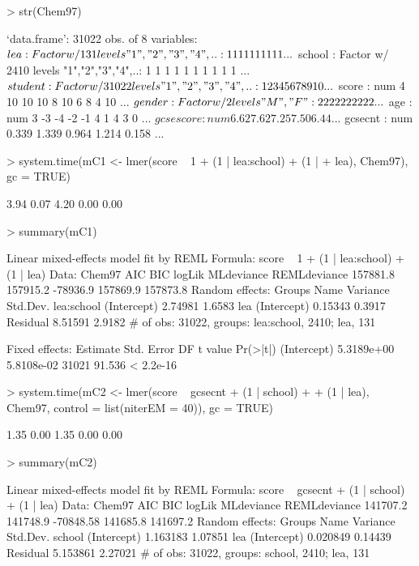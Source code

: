 \documentclass[12pt]{article}
\begin{document}
\begin{Schunk}
\begin{Sinput}
> str(Chem97)
\end{Sinput}
\begin{Soutput}
`data.frame':	31022 obs. of  8 variables:
 $ lea      : Factor w/ 131 levels "1","2","3","4",..: 1 1 1 1 1 1 1 1 1 1 ...
 $ school   : Factor w/ 2410 levels "1","2","3","4",..: 1 1 1 1 1 1 1 1 1 1 ...
 $ student  : Factor w/ 31022 levels "1","2","3","4",..: 1 2 3 4 5 6 7 8 9 10 ...
 $ score    : num  4 10 10 10 8 10 6 8 4 10 ...
 $ gender   : Factor w/ 2 levels "M","F": 2 2 2 2 2 2 2 2 2 2 ...
 $ age      : num  3 -3 -4 -2 -1 4 1 4 3 0 ...
 $ gcsescore: num  6.62 7.62 7.25 7.50 6.44 ...
 $ gcsecnt  : num  0.339 1.339 0.964 1.214 0.158 ...
\end{Soutput}
\begin{Sinput}
> system.time(mC1 <- lmer(score ~ 1 + (1 | lea:school) + (1 | 
+     lea), Chem97), gc = TRUE)
\end{Sinput}
\begin{Soutput}
[1] 3.94 0.07 4.20 0.00 0.00
\end{Soutput}
\begin{Sinput}
> summary(mC1)
\end{Sinput}
\begin{Soutput}
Linear mixed-effects model fit by REML
Formula: score ~ 1 + (1 | lea:school) + (1 | lea) 
   Data: Chem97 
      AIC      BIC   logLik MLdeviance REMLdeviance
 157881.8 157915.2 -78936.9   157869.9     157873.8
Random effects:
 Groups     Name        Variance Std.Dev.
 lea:school (Intercept) 2.74981  1.6583  
 lea        (Intercept) 0.15343  0.3917  
 Residual               8.51591  2.9182  
# of obs: 31022, groups: lea:school, 2410; lea, 131

Fixed effects:
              Estimate Std. Error    DF t value  Pr(>|t|)
(Intercept) 5.3189e+00 5.8108e-02 31021  91.536 < 2.2e-16
\end{Soutput}
\begin{Sinput}
> system.time(mC2 <- lmer(score ~ gcsecnt + (1 | school) + 
+     (1 | lea), Chem97, control = list(niterEM = 40)), gc = TRUE)
\end{Sinput}
\begin{Soutput}
[1] 1.35 0.00 1.35 0.00 0.00
\end{Soutput}
\begin{Sinput}
> summary(mC2)
\end{Sinput}
\begin{Soutput}
Linear mixed-effects model fit by REML
Formula: score ~ gcsecnt + (1 | school) + (1 | lea) 
   Data: Chem97 
      AIC      BIC    logLik MLdeviance REMLdeviance
 141707.2 141748.9 -70848.58   141685.8     141697.2
Random effects:
 Groups   Name        Variance Std.Dev.
 school   (Intercept) 1.163183 1.07851 
 lea      (Intercept) 0.020849 0.14439 
 Residual             5.153861 2.27021 
# of obs: 31022, groups: school, 2410; lea, 131


\end{Soutput}
\end{Schunk}
\end{document}
